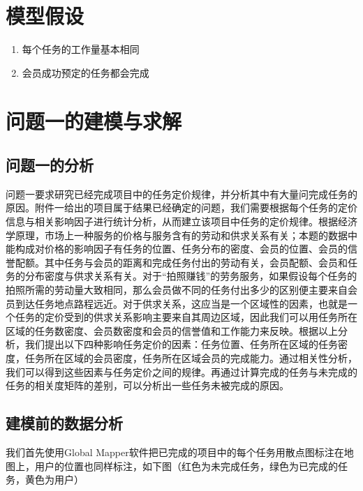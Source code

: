\documentclass[withoutpreface,bwprint]{cumcmthesis} %
\begin{document}
\section{模型假设}
\begin{enumerate}
    \item 每个任务的工作量基本相同
    \item 会员成功预定的任务都会完成
\end{enumerate}

\section{问题一的建模与求解}

\subsection{问题一的分析}
问题一要求研究已经完成项目中的任务定价规律，并分析其中有大量问完成任务的原因。附件一给出的项目属于结果已经确定的问题，我们需要根据每个任务的定价信息与相关影响因子进行统计分析，从而建立该项目中任务的定价规律。根据经济学原理，市场上一种服务的价格与服务含有的劳动和供求关系有关；本题的数据中能构成对价格的影响因子有任务的位置、任务分布的密度、会员的位置、会员的信誉配额。其中任务与会员的距离和完成任务付出的劳动有关，会员配额、会员和任务的分布密度与供求关系有关。对于“拍照赚钱”的劳务服务，如果假设每个任务的拍照所需的劳动量大致相同，那么会员做不同的任务付出多少的区别便主要来自会员到达任务地点路程远近。对于供求关系，这应当是一个区域性的因素，也就是一个任务的定价受到的供求关系影响主要来自其周边区域，因此我们可以用任务所在区域的任务数密度、会员数密度和会员的信誉值和工作能力来反映。根据以上分析，我们提出以下四种影响任务定价的因素：任务位置、任务所在区域的任务密度，任务所在区域的会员密度，任务所在区域会员的完成能力。通过相关性分析，我们可以得到这些因素与任务定价之间的规律。再通过计算完成的任务与未完成的任务的相关度矩阵的差别，可以分析出一些任务未被完成的原因。

\subsection{建模前的数据分析}
我们首先使用Global Mapper软件把已完成的项目中的每个任务用散点图标注在地图上，用户的位置也同样标注，如下图（红色为未完成任务，绿色为已完成的任务，黄色为用户）
\end{document}
